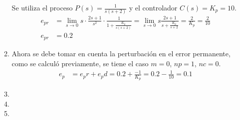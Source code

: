 \begin{ejercicio}
\begin{enumerate}
\begin{enumerate}
      Se utiliza el proceso $P(s)=\frac{1}{s(s+2)}$ y el controlador $C(s)=K_p=10$.
      \begin{align*}
        e_{pr} &= \lim_{s\rightarrow 0} s \cdot \frac{2s+1}{s^2} \cdot \frac{1}{1+\frac{K_p}{s(s+2)}}
        =
        \lim_{s\rightarrow 0} s\frac{2s+1}{s+\frac{K_p}{s+2}}
        = \frac{2}{K_p} = \frac{2}{10}
        \\
        e_{pr} &= 0.2
      \end{align*}

      \item %
      Ahora se debe tomar en cuenta la perturbación en el error permanente, como se calculó previamente, se tiene el caso $m=0$, $np=1$, $nc=0$.
      \begin{align*}
        e_p &= e_pr + e_pd = 0.2 + \frac{-1}{K_p} = 0.2 - \frac{1}{10} = 0.1
      \end{align*}

      \item %
      \item %
      \item %
    \end{enumerate}
  \end{enumerate}

\end{ejercicio}